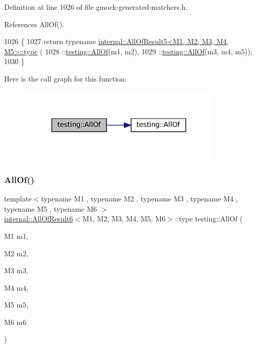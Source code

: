 Definition at line 1026 of file gmock-\/generated-\/matchers.\+h.



References All\+Of().


\begin{DoxyCode}
1026                                          \{
1027   \textcolor{keywordflow}{return} \textcolor{keyword}{typename} \hyperlink{namespacegenerate__debs_a50bc9a7ecac9584553e089a448bcde58}{internal::AllOfResult5<M1, M2, M3, M4, M5>::type}
      (
1028       ::\hyperlink{namespacetesting_af7618e8606c1cb45738163688944e2b7}{testing::AllOf}(m1, m2),
1029       ::\hyperlink{namespacetesting_af7618e8606c1cb45738163688944e2b7}{testing::AllOf}(m3, m4, m5));
1030 \}
\end{DoxyCode}
Here is the call graph for this function\+:
\nopagebreak
\begin{figure}[H]
\begin{center}
\leavevmode
\includegraphics[width=276pt]{namespacetesting_ab8f5e6cf1c22acf51a2b9b376b0ef03a_cgraph}
\end{center}
\end{figure}
\mbox{\label{namespacetesting_afc8e2d405f80e7d3df32842ddb648125}} 
\subsubsection{\texorpdfstring{All\+Of()}{AllOf()}\hspace{0.1cm}{\footnotesize\ttfamily [5/9]}}
{\footnotesize\ttfamily template$<$typename M1 , typename M2 , typename M3 , typename M4 , typename M5 , typename M6 $>$ \\
\hyperlink{structtesting_1_1internal_1_1AllOfResult6}{internal\+::\+All\+Of\+Result6}$<$M1, M2, M3, M4, M5, M6$>$\+::type testing\+::\+All\+Of (\begin{DoxyParamCaption}\item[{M1}]{m1,  }\item[{M2}]{m2,  }\item[{M3}]{m3,  }\item[{M4}]{m4,  }\item[{M5}]{m5,  }\item[{M6}]{m6 }\end{DoxyParamCaption})\hspace{0.3cm}{\ttfamily [inline]}}



